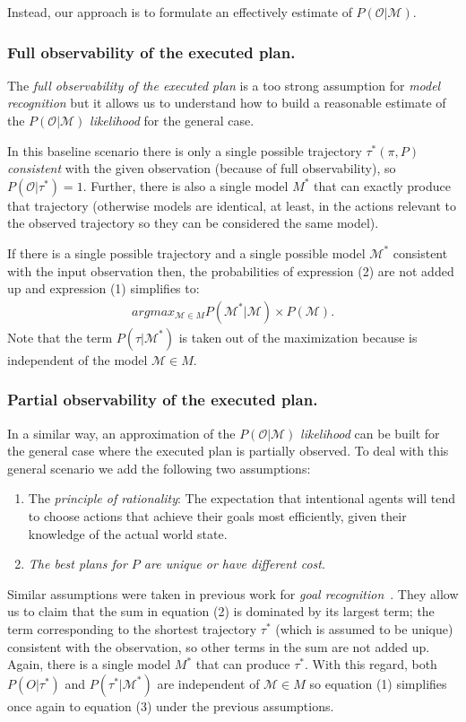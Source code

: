 \documentclass[letterpaper]{article} %
\begin{document}
Instead, our approach is to formulate an effectively estimate of $P(\mathcal{O}|\mathcal{M})$.

\subsubsection{Full observability of the executed plan.} The {\em full observability of the executed plan} is a too strong assumption for {\em model recognition} but it allows us to understand how to build a reasonable estimate of the $P(\mathcal{O}|\mathcal{M})$ {\em likelihood} for the general case.

In this baseline scenario there is only a single possible trajectory $\tau^*(\pi,P)$ {\em consistent} with the given observation (because of full observability), so $P(\mathcal{O}|\tau^*)=1$. Further, there is also a single model $M^*$ that can exactly produce that trajectory (otherwise models are identical, at least, in the actions relevant to the observed trajectory so they can be considered the same model).

If there is a single possible trajectory and a single possible model $\mathcal{M}^*$ consistent with the input observation then, the probabilities of expression (2) are not added up and expression (1) simplifies to:
\begin{align}
argmax_{\mathcal{M}\in M} P(\mathcal{M^*}|\mathcal{M}) \times P(\mathcal{M}).
\end{align}
Note that the term $P(\tau|\mathcal{M^*})$ is taken out of the maximization because is independent of the model $\mathcal{M}\in M$.

\subsubsection{Partial observability of the executed plan.} In a similar way, an approximation of the $P(\mathcal{O}|\mathcal{M})$ {\em likelihood} can be built for the general case where the executed plan is partially observed. To deal with this general scenario we add the following two assumptions:
\begin{enumerate}
\item The {\em principle of rationality}: The expectation that intentional agents will tend to choose actions that achieve their goals most efficiently, given their knowledge of the actual world state.
\item {\em The best plans for $P$ are unique or have different cost}.  
\end{enumerate}
Similar assumptions were taken in previous work for {\em goal recognition}~\cite{ramirez2012plan}. They allow us to claim that the sum in equation (2) is dominated by its largest term; the term corresponding to the shortest trajectory $\tau^*$ (which is assumed to be unique) consistent with the observation, so other terms in the sum are not added up. Again, there is a single model $M^*$ that can produce $\tau^*$. With this regard, both $P(O|\tau^*)$ and $P(\tau^*|\mathcal{M}^*)$ are independent of $\mathcal{M} \in M$ so equation (1) simplifies once again to equation (3) under the previous assumptions.
\end{document}
